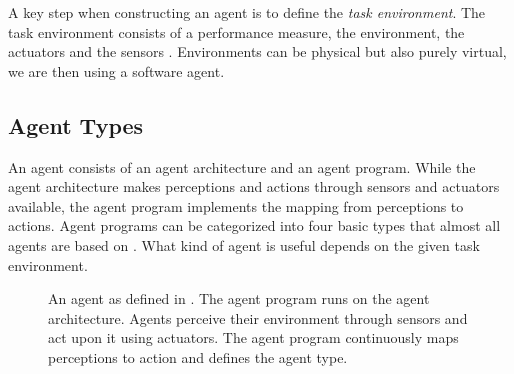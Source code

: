 \documentclass[../main.tex]{subfiles}
\begin{document}
A key step when constructing an agent is to define the \emph{task environment}.
The task environment consists of a performance measure, the environment, the actuators and the sensors \cite{Russel2022}.
Environments can be physical but also purely virtual, we are then using a software agent.

\subsection{Agent Types}

An agent consists of an agent architecture and an agent program.
While the agent architecture makes perceptions and actions through sensors and actuators available,
the agent program implements the mapping from perceptions to actions.
Agent programs can be categorized into four basic types that almost all agents are based on \cite{Russel2022}.
What kind of agent is useful depends on the given task environment.

\begin{figure}[t]
    \centering
    \caption{An agent as defined in \citeauthor{Russel2022}.
        The agent program runs on the agent architecture.
        Agents perceive their environment through sensors and act upon it using actuators.
        The agent program continuously maps perceptions to action and defines the agent type.}
    \label{fig:agent_overview}
\end{figure}
\end{document}
